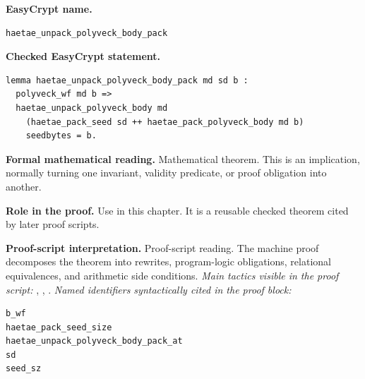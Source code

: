 \begin{formaltheorem}
\noindent\textbf{EasyCrypt name.}
\begin{lstlisting}[language=EasyCrypt,basicstyle=\ttfamily\scriptsize]
haetae_unpack_polyveck_body_pack
\end{lstlisting}
\noindent\textbf{Checked EasyCrypt statement.}
\begin{lstlisting}[language=EasyCrypt,basicstyle=\ttfamily\scriptsize]
lemma haetae_unpack_polyveck_body_pack md sd b :
  polyveck_wf md b =>
  haetae_unpack_polyveck_body md
    (haetae_pack_seed sd ++ haetae_pack_polyveck_body md b)
    seedbytes = b.
\end{lstlisting}
\noindent\textbf{Formal mathematical reading.}
Mathematical theorem. This is an implication, normally turning one invariant, validity predicate, or proof obligation into another.

\noindent\textbf{Role in the proof.}
Use in this chapter. It is a reusable checked theorem cited by later proof scripts.

\noindent\textbf{Proof-script interpretation.}
Proof-script reading. The machine proof decomposes the theorem into rewrites, program-logic obligations, relational equivalences, and arithmetic side conditions.
\emph{Main tactics visible in the proof script:} , , .
\emph{Named identifiers syntactically cited in the proof block:}
\begin{lstlisting}[language=EasyCrypt,basicstyle=\ttfamily\scriptsize]
b_wf
haetae_pack_seed_size
haetae_unpack_polyveck_body_pack_at
sd
seed_sz
\end{lstlisting}

\end{formaltheorem}

